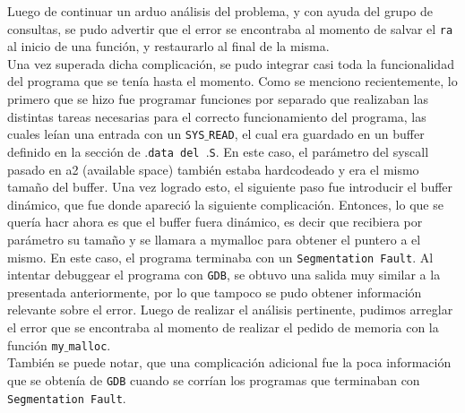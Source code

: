 \documentclass[a4paper, 10pt]{article}
\def\code#1{\texttt{#1}}
\begin{document}
		Luego de continuar un arduo análisis del problema, y con ayuda del grupo de consultas, se pudo advertir que el error se encontraba al momento de salvar el \code{ra} al inicio de una función, y restaurarlo al final de la misma.
		\\
		Una vez superada dicha complicación, se pudo integrar casi toda la funcionalidad del programa que se tenía hasta el momento. Como se menciono recientemente, lo primero que se hizo fue programar funciones por separado que realizaban las distintas tareas necesarias para el correcto funcionamiento del programa, las cuales leían una entrada con un \code{SYS$\_$READ}, el cual era guardado en un buffer definido en la sección de \code{$.$data del $.$S}. En este caso, el parámetro del syscall pasado en a2 (available space) también estaba hardcodeado y era el mismo tamaño del buffer. Una vez logrado esto, el siguiente paso fue introducir el buffer dinámico, que fue donde apareció la siguiente complicación. Entonces, lo que se quería hacr ahora es que el buffer fuera dinámico, es decir que recibiera por parámetro su tamaño y se llamara a mymalloc para obtener el puntero a el mismo. En este caso, el programa terminaba con un \code{Segmentation Fault}. Al intentar debuggear el programa con \code{GDB}, se obtuvo una salida muy similar a la presentada anteriormente, por lo que tampoco se pudo obtener información relevante sobre el error. Luego de realizar el análisis pertinente, pudimos arreglar el error que se encontraba al momento de realizar el pedido de memoria con la función \code{my$\_$malloc}.
		\\
		También se puede notar, que una complicación adicional fue la poca información que se obtenía de \code{GDB} cuando se corrían los programas que terminaban con \code{Segmentation Fault}.
\end{document}
